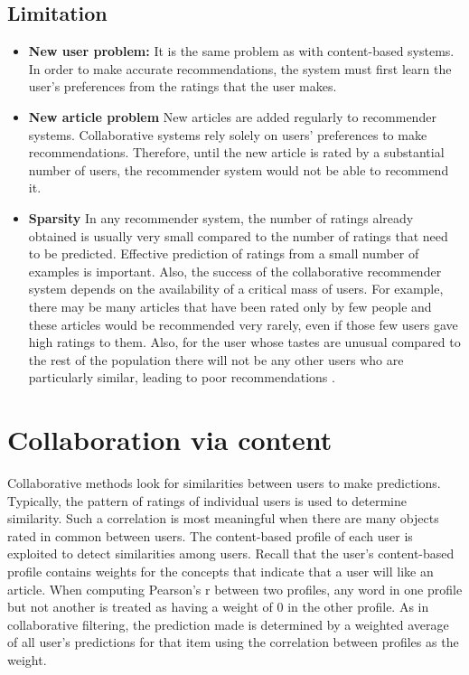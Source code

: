 \subsection{Limitation}
\begin{itemize}
\item {\textbf{New user problem:} It is the same problem as with content-based systems. In order to make accurate recommendations, the system must first learn the user’s preferences from the ratings that the user makes.}

\item{\textbf{New article problem}
New articles are added regularly to recommender systems. Collaborative systems rely solely on users’ preferences to make recommendations. Therefore, until the new article is rated by a substantial number of users, the recommender system would not be able to recommend it.}

\item{\textbf{Sparsity}
In any recommender system, the number of ratings already obtained is usually very small compared to the number of ratings that need to be predicted. Effective prediction of ratings from a small number of examples is important. Also, the success of the collaborative recommender system depends on the availability of a critical mass of users. For example, there may be many articles that have been rated only by few people and these articles would be recommended very rarely, even if those few users gave high ratings to them. Also, for the user whose tastes are unusual compared to the rest of the population there will not be any other users who are particularly similar, leading to poor recommendations \citep{recom_8}.}
\end{itemize}

\section{Collaboration via content}
Collaborative methods look for similarities between users to make predictions. Typically, the pattern of ratings of individual users is used to determine similarity. Such a correlation is most meaningful when there are many objects rated in common between users.
The content-based profile of each user is exploited to detect similarities among users. Recall that the user’s content-based profile contains weights for the concepts that indicate that a user will like an article. When computing Pearson’s r between two profiles, any word in one profile but not another is treated as having a weight of 0 in the other profile. As in collaborative filtering, the prediction made is determined by a weighted average of all user’s predictions for that item using the correlation between profiles as the weight.


